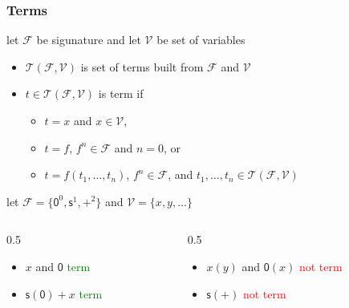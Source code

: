 \documentclass[12pt,aspectratio=169]{beamer}
\newcommand{\m}[1]{\mathsf{#1}}
\newcommand{\FF}{\mathcal{F}}
\newcommand{\VV}{\mathcal{V}}
\newcommand{\TT}{\mathcal{T}}
\newlength{\mytotalwidth}
\newlength{\mycolumnwidth}
\begin{document}
\begin{frame}
    \frametitle{Terms}
    \begin{definition}
        let $\FF$ be sigunature and let $\VV$ be set of variables
        \begin{itemize}
            \item \alert{$\TT(\FF,\VV)$} is set of terms built from $\FF$ and $\VV$
            \item $t \in \TT(\FF,\VV)$ is \alert{term} if
                \begin{itemize}
                    \item $t = x$ and $x \in \VV$,
                    \item $t = f$, $f^n \in \FF$ and $n = 0$, or
                    \item $t = f(t_1, \dots, t_n)$, $f^n \in \FF$, and $t_1, \dots, t_n \in \TT(\FF,\VV)$ 
                \end{itemize}
        \end{itemize}
    \end{definition}
    \pause
    \begin{example}
        let $\FF = \{\m{0}^0, \m{s}^1, \m{+}^2\}$ and $\VV = \{x,y,\dots\}$
        \pause
        \vspace{-12pt}
        \begin{columns}[totalwidth=\mytotalwidth]
            \begin{column}[t]{0.5\mycolumnwidth}
                \begin{itemize}
                    \item $x$ and $\m{0}$ \quad \textcolor{green}{term}
                    \pause
                    \item $\m{s}(\m{0}) + x$ \quad \textcolor{green}{term}
                    \pause
                \end{itemize}
            \end{column}
            \begin{column}[t]{0.5\mycolumnwidth}
                \begin{itemize}
                    \item $x(y)$ and $\m{0}(x)$ \quad \textcolor{red}{not term}
                    \pause
                    \item $\m{s}(+)$ \quad \textcolor{red}{not term}
                \end{itemize}
            \end{column}
        \end{columns}
    \end{example}
\end{frame}
\end{document}
